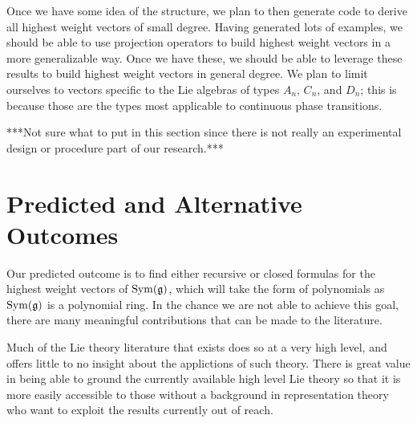 \documentclass[11pt, reqno]{amsart}
\begin{document}
Once we have some idea of the structure, we plan to then generate code to derive all highest weight vectors of small degree. Having generated lots of examples, we should be able to use projection operators to build highest weight vectors in a more generalizable way. Once we have these, we should be able to leverage these results to build highest weight vectors in general degree. We plan to limit ourselves to vectors specific to the Lie algebras of types $A_{n}$, $C_{n}$, and $D_{n}$; this is because those are the types most applicable to continuous phase transitions.






***Not sure what to put in this section since there is not really an experimental design or procedure part of our research.***

\section{Predicted and Alternative Outcomes}

Our predicted outcome is to find either recursive or closed formulas for the highest weight vectors of $\operatorname{Sym}(\mathfrak{g})$, which will take the form of polynomials as $\operatorname{Sym}(\mathfrak{g})$ is a polynomial ring. In the chance we are not able to achieve this goal, there are many meaningful contributions that can be made to the literature.

Much of the Lie theory literature that exists does so at a very high level, and offers little to no insight about the applictions of such theory. There is great value in being able to ground the currently available high level Lie theory so that it is more easily accessible to those without a background in representation theory who want to exploit the results currently out of reach.
\end{document}
